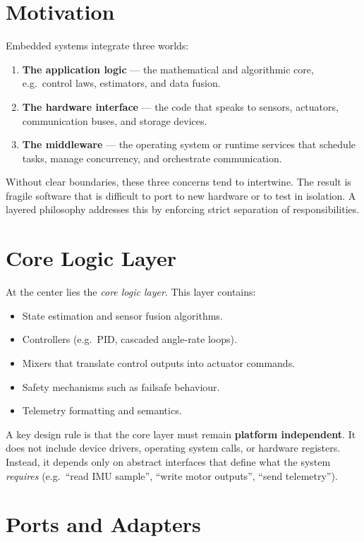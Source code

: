 \section{Motivation}

Embedded systems integrate three worlds:
\begin{enumerate}
    \item \textbf{The application logic} --- the mathematical and algorithmic core, e.g.\ control laws, estimators, and data fusion.
    \item \textbf{The hardware interface} --- the code that speaks to sensors, actuators, communication buses, and storage devices.
    \item \textbf{The middleware} --- the operating system or runtime services that schedule tasks, manage concurrency, and orchestrate communication.
\end{enumerate}

Without clear boundaries, these three concerns tend to intertwine. 
The result is fragile software that is difficult to port to new hardware or to test in isolation. 
A layered philosophy addresses this by enforcing strict separation of responsibilities.

\section{Core Logic Layer}

At the center lies the \emph{core logic layer}. 
This layer contains:
\begin{itemize}
    \item State estimation and sensor fusion algorithms.
    \item Controllers (e.g.\ PID, cascaded angle-rate loops).
    \item Mixers that translate control outputs into actuator commands.
    \item Safety mechanisms such as failsafe behaviour.
    \item Telemetry formatting and semantics.
\end{itemize}

A key design rule is that the core layer must remain \textbf{platform independent}. 
It does not include device drivers, operating system calls, or hardware registers. 
Instead, it depends only on abstract interfaces that define what the system \emph{requires} (e.g.\ ``read IMU sample'', ``write motor outputs'', ``send telemetry'').

\section{Ports and Adapters}

